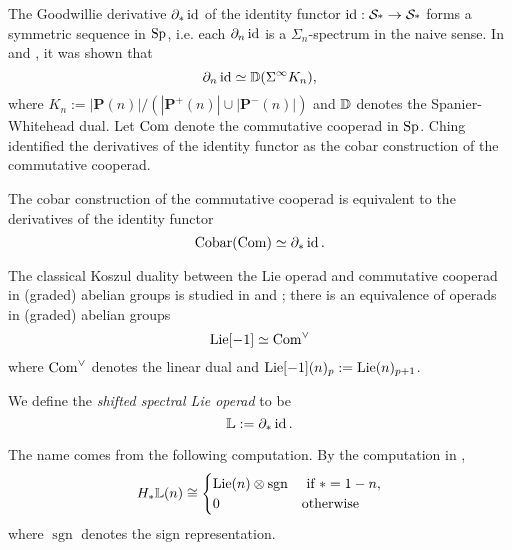 	The Goodwillie derivative $\partial_* \operatorname{id}$ of the identity functor $\operatorname{id}: \operatorname{\mathcal{S}_{*}} \to \operatorname{\mathcal{S}_{*}}$ forms a symmetric sequence in $\operatorname{Sp}$, i.e. each $\partial_n \operatorname{id}$ is a $\Sigma_n$-spectrum in the naive sense. In \cite{JohnsonDerivative} and \cite{Arone-Mahowald}, it was shown that
	$$
	\partial_n \operatorname{id} \simeq {\mathbb{D}}(\Sigma^{\infty} K_n),
	$$
	where 
	$
	K_{n}:=|\mathbf{P}(n)| /\left(\left|\mathbf{P}^{+}(n)\right| \cup\left|\mathbf{P}^{-}(n)\right|\right)
	$
	and ${\mathbb{D}}$ denotes the Spanier-Whitehead dual. 
	Let $\operatorname{Com}$ denote the commutative cooperad in $\operatorname{Sp}$.
	Ching \cite{ChingBar} identified the derivatives of the identity functor as the cobar construction of the commutative cooperad.
	\begin{proposition}
	\cite[Remark 8.9]{ChingBar}
	The cobar construction of the commutative cooperad is equivalent to the derivatives of the identity functor
	$$
	\operatorname{Cobar}(\operatorname{Com})\simeq \partial_* \operatorname{id}.
	$$
	\end{proposition}
	
	\begin{remark}
    The classical Koszul duality between the Lie operad and commutative cooperad in (graded) abelian groups is studied in \cite{Ginzburg-Kapranov} and \cite{Loday-Vallette};
    there is an equivalence of operads in (graded) abelian groups
    \[
    \operatorname{Lie}[-1] \simeq \operatorname{Com}^{\vee}
    \]
    where $\operatorname{Com}^{\vee}$ denotes the linear dual and $\operatorname{Lie}[-1](n)_p:=\operatorname{Lie}(n)_{p+1}$.
    \end{remark}
    
	\begin{definition}
	\label{Shifted Spectral Lie Operad}
	    	We define the \emph{shifted spectral Lie operad} to be
	    	$$
	    	{\mathbb{L}}:= \partial_* \operatorname{id}.
	    	$$
	\end{definition}

	The name comes from the following computation. By the computation in \cite[Example 9.50]{ChingBar},
	$$
	H_{*}{\mathbb{L}}(n) \cong 	
	\begin{cases}
	\operatorname{Lie}(n) \otimes \operatorname{sgn}& \text{ if $*=1-n$},\\
	0 & \text{otherwise}
	\end{cases}
	$$	
	where $\operatorname{sgn}$ denotes the sign representation.


